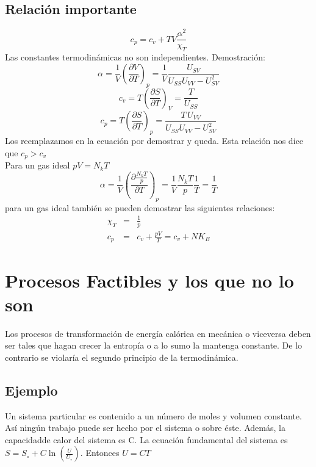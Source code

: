 \documentclass[10pt,twocolumn]{IEEEtran2e}
\begin{document}
\subsection*{Relaci\'on importante}
\begin{equation}
 c_{p} = c_{v} + TV \frac{\alpha^{2}}{\chi_{T}}
\end{equation}
Las constantes termodin\'amicas no son independientes. 
Demostraci\'on:
\begin{equation}
 \alpha=\frac{1}{V} \left(\frac{\partial V}{\partial T}\right)_{p}=\frac{1}{V}\frac{U_{SV}}{U_{SS}U_{VV}-U_{SV}^{2}}
\end{equation}
\begin{equation}
 c_{v}=T\left(\frac{\partial S}{\partial T}\right)_{V}=\frac{T}{U_{SS}}
\end{equation}
\begin{equation}
 c_{p}=T\left(\frac{\partial S}{\partial T}\right)_{p}=\frac{T\,U_{VV}}{U_{SS}U_{VV}-U_{SV}^{2}}
\end{equation}
Los reemplazamos en la ecuaci\'on por demostrar y queda.
Esta relaci\'on nos dice que $c_{p}>c_{v}$\\

Para un gas ideal $pV=N_{k}T$
\begin{equation}
 \alpha = \frac{1}{V}\left(\frac{\partial \frac{N_{k}T}{p}}{\partial T} \right)_{p} = \frac{1}{V}\frac{N_{k}T}{p}\frac{1}{T}=\frac{1}{T}
\end{equation}
para un gas ideal tambi\'en se pueden demostrar las siguientes relaciones:
\begin{eqnarray}
 \chi_{T}&=&\frac{1}{p}\\
 c_{p} &=& c_{v} + \frac{pV}{T} = c_{v}+NK_{B} 
\end{eqnarray}


\section{Procesos Factibles y los que no lo son}
Los procesos de transformaci\'on de energ\'ia cal\'orica en mec\'anica o viceversa deben ser tales que hagan crecer la entrop\'ia o a lo sumo la mantenga constante. De lo contrario se violar\'ia el segundo principio de la termodin\'amica.

\subsection*{Ejemplo}
Un sistema particular es contenido a un n\'umero de moles y volumen constante. As\'i ning\'un trabajo puede ser hecho por el sistema o sobre \'este. Adem\'as, la capacidadde calor del sistema es C. La ecuaci\'on fundamental del sistema es $S=S_{\circ} + C \ln(\frac{U}{U_{\circ}})$. Entonces $U=CT$
\end{document}
